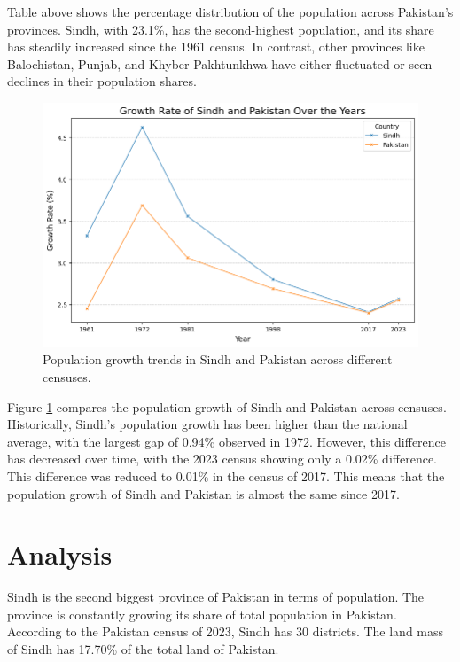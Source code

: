 \documentclass{article}
\begin{document}
\noindent Table above shows the percentage distribution of the population across Pakistan's provinces. Sindh, with 23.1\%, has the second-highest population, and its share has steadily increased since the 1961 census. In contrast, other provinces like Balochistan, Punjab, and Khyber Pakhtunkhwa have either fluctuated or seen declines in their population shares.

\begin{figure}[H]
    \centering
    \includegraphics[width=\textwidth]{../Figures/Figure02.png}
    \caption{Population growth trends in Sindh and Pakistan across different censuses.}
    \label{fig:fig2}
\end{figure}

\noindent Figure \ref{fig:fig2} compares the population growth of Sindh and Pakistan across censuses. Historically, Sindh's population growth has been higher than the national average, with the largest gap of 0.94\% observed in 1972. However, this difference has decreased over time, with the 2023 census showing only a 0.02\% difference. This difference was reduced to 0.01\% in the census of 2017. This means that the population growth of Sindh and Pakistan is almost the same since 2017. 

\section*{Analysis}
\noindent Sindh is the second biggest province of Pakistan in terms of population. The province is constantly growing its share of total population in Pakistan. According to the Pakistan census of 2023, Sindh has 30 districts. The land mass of Sindh has 17.70\% of the total land of Pakistan.



\end{document}
